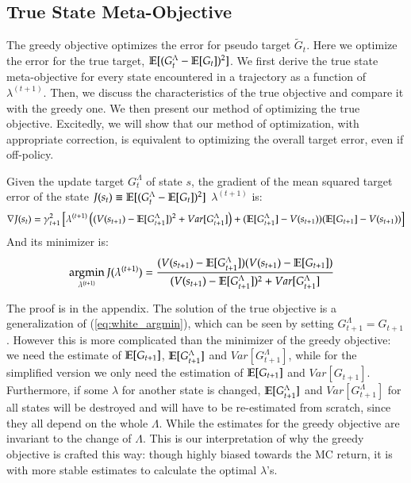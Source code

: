 \documentclass{article}
\begin{document}
\subsection{True State Meta-Objective}
The greedy objective optimizes the error for pseudo target $\tilde{G}_t$. Here we optimize the error for the true target, \ie{} $\mathbb{E}[(G_t^\Lambda - \mathbb{E}[G_t])^2]$. We first derive the true state meta-objective for every state encountered in a trajectory as a function of $\lambda^{(t+1)}$. Then, we discuss the characteristics of the true objective and compare it with the greedy one. We then present our method of optimizing the true objective. Excitedly, we will show that our method of optimization, with appropriate correction, is equivalent to optimizing the overall target error, even if off-policy.
\par
\begin{proposition}\label{prop:objective}
Given the update target $G_t^\Lambda$ of state $s$, the gradient of the mean squared target error of the state $J(s_t) \equiv \mathbb{E}[(G_t^\Lambda - \mathbb{E}[G_t])^2]$ \wrt{} $\lambda^{(t+1)}$ is:
\begin{equation}
\nonumber
\nabla J(s_t) = \gamma_{t+1}^2 \left[\lambda^{(t+1)} \left( (V(s_{t+1}) - \mathbb{E}[G_{t+1}^\Lambda])^2 + Var[G_{t+1}^\Lambda] \right) + (\mathbb{E}[G_{t+1}^\Lambda] - V(s_{t+1}))(\mathbb{E}[G_{t+1}] - V(s_{t+1}))\right]
\end{equation}
And its minimizer is:
\begin{equation}
\begin{aligned}
& \operatorname*{argmin}_{\lambda^{(t+1)}}{J(\lambda^{(t+1)})} = \frac{
(V(s_{t+1}) - \mathbb{E}[G_{t+1}^\Lambda])
    (V(s_{t+1}) - \mathbb{E}[G_{t+1}])
}
{(V(s_{t+1}) - \mathbb{E}[G_{t+1}^\Lambda])^2 + Var[G_{t+1}^\Lambda]}
\end{aligned}\nonumber
\end{equation}
\end{proposition}
The proof is in the appendix. The solution of the true objective is a generalization of (\ref{eq:white_argmin}), which can be seen by setting $G_{t+1}^\Lambda = G_{t+1}$. However this is more complicated than the minimizer of the greedy objective: we need the estimate of $\mathbb{E}[G_{t+1}]$, $\mathbb{E}[G_{t+1}^\Lambda]$ and $Var[G_{t+1}^\Lambda]$, while for the simplified version we only need the estimation of $\mathbb{E}[G_{t+1}]$ and $Var[G_{t+1}]$. Furthermore, if some $\lambda$ for another state is changed, $\mathbb{E}[G_{t+1}^\Lambda]$ and $Var[G_{t+1}^\Lambda]$ for all states will be destroyed and will have to be re-estimated from scratch, since they all depend on the whole $\Lambda$. While the estimates for the greedy objective are invariant to the change of $\Lambda$. This is our interpretation of why the greedy objective is crafted this way: though highly biased towards the MC return, it is with more stable estimates to calculate the optimal $\lambda$'s.
\end{document}
